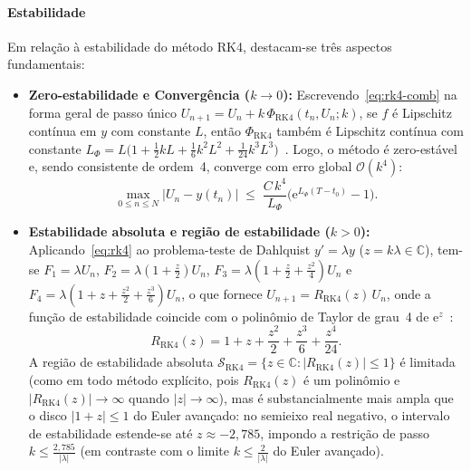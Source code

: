 \documentclass[12pt, a4paper]{article}
\begin{document}
\paragraph{Estabilidade} Em relação à estabilidade do método RK4, destacam-se três aspectos fundamentais:
\begin{itemize}
  \item \textbf{Zero-estabilidade e Convergência ($k \to 0$):} Escrevendo~\eqref{eq:rk4-comb} na forma geral de passo
    único $U_{n+1} = U_n + k\,\Phi_{\text{RK4}}(t_n, U_n; k)$, se $f$ é Lipschitz contínua em $y$ com constante $L$,
    então $\Phi_{\text{RK4}}$ também é Lipschitz contínua com constante
    $L_{\Phi} = L\bigl(1 + \frac{1}{2}kL + \frac{1}{6}k^2L^2 + \frac{1}{24}k^3L^3\bigr)$~\cite{suli2003}. Logo, o método
    é zero-estável e, sendo consistente de ordem~4, converge com erro global $\mathcal{O}(k^4)$:
    \begin{equation}\label{eq:cota-rk4}
      \max_{0 \le n \le N} |U_n - y(t_n)| \;\le\; \frac{C\,k^4}{L_{\Phi}}\bigl(\mathrm{e}^{L_{\Phi}(T - t_0)} - 1\bigr).
    \end{equation}
  \item \textbf{Estabilidade absoluta e região de estabilidade ($k > 0$):} Aplicando~\eqref{eq:rk4} ao problema-teste de
    Dahlquist $y' = \lambda y$ ($z = k\lambda \in \mathbb{C}$), tem-se $F_1 = \lambda U_n$,
    $F_2 = \lambda(1 + \frac{z}{2})U_n$, $F_3 = \lambda(1 + \frac{z}{2} + \frac{z^2}{4})U_n$ e
    $F_4 = \lambda(1 + z + \frac{z^2}{2} + \frac{z^3}{6})U_n$, o que fornece $U_{n+1} = R_{\text{RK4}}(z)\,U_n$, onde a
    função de estabilidade coincide com o polinômio de Taylor de grau~4 de $\mathrm{e}^z$~\cite{leveque2007}:
    \begin{equation}\label{eq:R-rk4}
      R_{\text{RK4}}(z) = 1 + z + \frac{z^2}{2} + \frac{z^3}{6} + \frac{z^4}{24}.
    \end{equation}
    A região de estabilidade absoluta $\mathcal{S}_{\text{RK4}} = \{z \in \mathbb{C} : |R_{\text{RK4}}(z)| \le 1\}$ é
    limitada (como em todo método explícito, pois $R_{\text{RK4}}(z)$ é um polinômio e $|R_{\text{RK4}}(z)| \to \infty$
    quando $|z| \to \infty$), mas é substancialmente mais ampla que o disco $|1+z| \le 1$ do Euler avançado: no semieixo
    real negativo, o intervalo de estabilidade estende-se até $z \approx -2{,}785$, impondo a restrição de passo $k \le \frac{2{,}785}{|\lambda|}$ (em contraste com o limite $k \le \frac{2}{|\lambda|}$ do Euler avançado).
\end{itemize}
\end{document}
